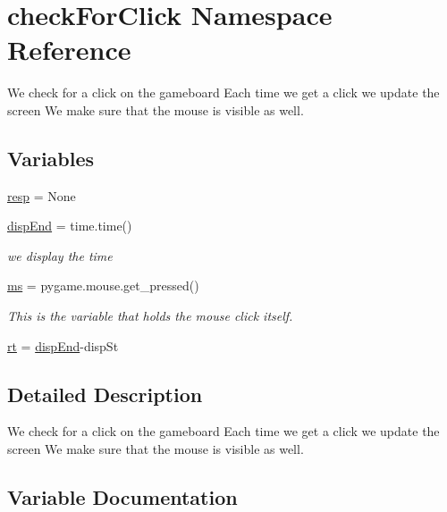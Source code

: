 \hypertarget{namespacecheckForClick}{}\section{check\+For\+Click Namespace Reference}
\label{namespacecheckForClick}


We check for a click on the gameboard Each time we get a click we update the screen We make sure that the mouse is visible as well.  


\subsection*{Variables}
\begin{DoxyCompactItemize}
\item 
\hyperlink{namespacecheckForClick_a8ad938c67f920c467a20df429000deab}{resp} = None
\item 
\hyperlink{namespacecheckForClick_a03b36bef66bab16870bb425facf34e19}{disp\+End} = time.\+time()
\begin{DoxyCompactList}\small\item\em we display the time \end{DoxyCompactList}\item 
\hyperlink{namespacecheckForClick_aaa5f9fa30d3427e63fa6f462d4ef0512}{ms} = pygame.\+mouse.\+get\+\_\+pressed()
\begin{DoxyCompactList}\small\item\em This is the variable that holds the mouse click itself. \end{DoxyCompactList}\item 
\hyperlink{namespacecheckForClick_afed10c5565034ea04004f801717b2897}{rt} = \hyperlink{namespacecheckForClick_a03b36bef66bab16870bb425facf34e19}{disp\+End}-\/disp\+St
\end{DoxyCompactItemize}


\subsection{Detailed Description}
We check for a click on the gameboard Each time we get a click we update the screen We make sure that the mouse is visible as well. 

\subsection{Variable Documentation}
